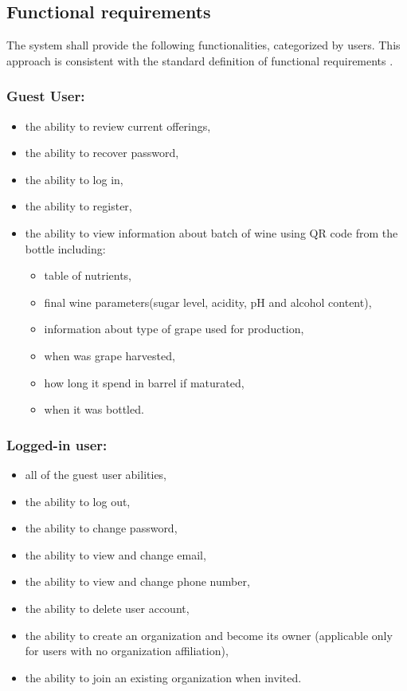 \subsection{Functional requirements}
The system shall provide the following functionalities, categorized by users. This approach is consistent with the standard definition of functional requirements \cite{sommerville2017}.
\subsubsection{Guest User:}
\begin{itemize}
	\item the ability to review current offerings,
	\item the ability to recover password,
	\item the ability to log in,
	\item the ability to register,
	\item the ability to view information about batch of wine using QR code from the bottle including:
	\begin{itemize}
		\item table of nutrients,
		\item final wine parameters(sugar level, acidity, pH and alcohol content),
		\item information about type of grape used for production,
		\item when was grape harvested,
		\item how long it spend in barrel if maturated,
		\item when it was bottled.
	\end{itemize}
\end{itemize}
\subsubsection{Logged-in user:}
\begin{itemize}
	\item all of the guest user abilities,
	\item the ability to log out,
	\item the ability to change password,
	\item the ability to view and change email,
	\item the ability to view and change phone number,
	\item the ability to delete user account,
	\item the ability to create an organization and become its owner (applicable only for users with no organization affiliation),
	\item the ability to join an existing organization when invited.
\end{itemize}
